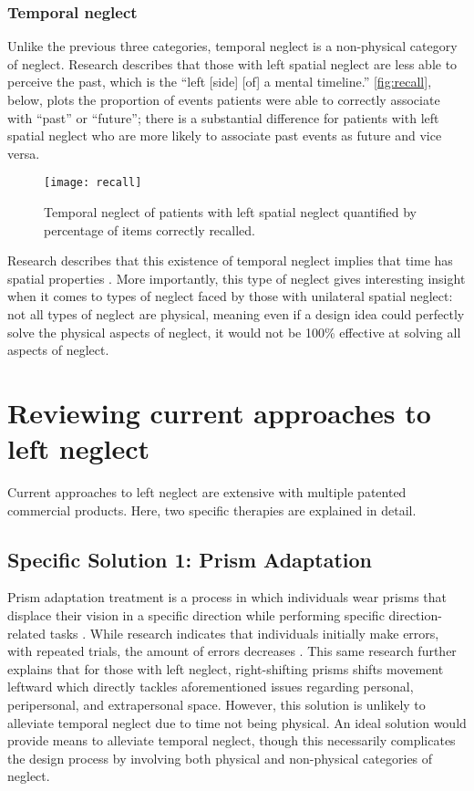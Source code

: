 \subsubsection{Temporal neglect}

Unlike the previous three categories, temporal neglect is a non-physical
category of neglect. Research \cite{saj_patients_2014} describes that those
with left spatial neglect are less able to perceive the past, which is the
``left [side] [of] a mental timeline.'' \autoref{fig:recall}, below, plots the
proportion of events patients were able to correctly associate with ``past'' or
``future''; there is a substantial difference for patients with left spatial
neglect who are more likely to associate past events as future and vice versa.

\begin{figure}[h]
  \centering
  \texttt{[image: recall]}
  \caption{Temporal neglect of patients with left spatial neglect quantified by
    percentage of items correctly recalled.}
  \label{fig:recall}
\end{figure}

Research describes that this existence of temporal neglect implies that time
has spatial properties \cite{saj_patients_2014}. More importantly, this type of
neglect gives interesting insight when it comes to types of neglect faced by
those with unilateral spatial neglect: not all types of neglect are physical,
meaning even if a design idea could perfectly solve the physical aspects of
neglect, it would not be 100\% effective at solving all aspects of neglect.

\section{Reviewing current approaches to left neglect}

Current approaches to left neglect are extensive with multiple patented
commercial products. Here, two specific therapies are explained in detail.

\subsection{Specific Solution 1: Prism Adaptation}

Prism adaptation treatment is a process in which individuals wear prisms that
displace their vision in a specific direction while performing specific
direction-related tasks \cite{goedert_prism_2015}. While research indicates
that individuals initially make errors, with repeated trials, the amount of
errors decreases \cite{goedert_prism_2015}. This same research further explains
that for those with left neglect, right-shifting prisms shifts movement
leftward \cite{goedert_prism_2015} which directly tackles aforementioned issues
regarding personal, peripersonal, and extrapersonal space. However, this
solution is unlikely to alleviate temporal neglect due to time not being
physical. An ideal solution would provide means to alleviate temporal neglect,
though this necessarily complicates the design process by involving both
physical and non-physical categories of neglect. 

